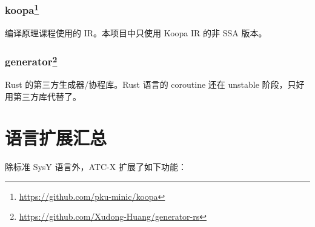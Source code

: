 \subsubsection[koopa]{koopa\footnote{\url{https://github.com/pku-minic/koopa}}}
编译原理课程使用的 IR。本项目中只使用 Koopa IR 的非 SSA 版本。
\subsubsection[generator]{generator\footnote{\url{https://github.com/Xudong-Huang/generator-rs}}}
Rust 的第三方生成器/协程库。Rust 语言的 coroutine 还在 unstable 阶段，只好用第三方库代替了。
\section{语言扩展汇总}\label{lang-ext}
除标准 SysY 语言外，ATC-X 扩展了如下功能：
